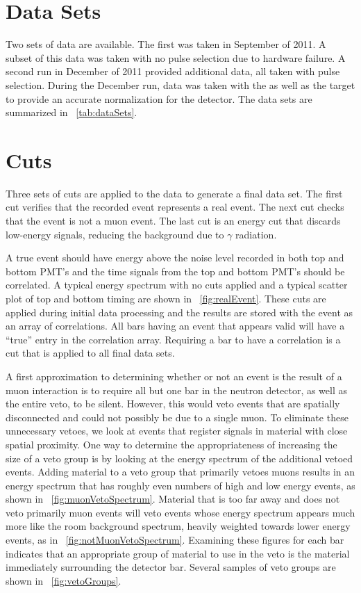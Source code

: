 \section{Data Sets}
Two sets of \reaction data are available.  The first was taken in September of 2011.  A subset of this data was taken with no pulse selection due to hardware failure.  A second run in December of 2011 provided additional data, all taken with pulse selection.  During the December run, data was taken with the \GeTargets as well as the  target to provide an accurate normalization for the detector.  The data sets are summarized in {\tab}~\ref{tab:dataSets}.

\section{Cuts}
Three sets of cuts are applied to the data to generate a final data set.  The first cut verifies that the recorded event represents a real event.  The next cut checks that the event is not a muon event.  The last cut is an energy cut that discards low-energy signals, reducing the background due to $\gamma$ radiation.

A true event should have energy above the noise level recorded in both top and bottom PMT's and the time signals from the top and bottom PMT's should be correlated.  A typical energy spectrum with no cuts applied and a typical scatter plot of top and bottom timing are shown in {\fig}~\ref{fig:realEvent}.  These cuts are applied during initial data processing and the results are stored with the event as an array of correlations.  All bars having an event that appears valid will have a ``true'' entry in the correlation array.  Requiring a bar to have a correlation is a cut that is applied to all final data sets.

A first approximation to determining whether or not an event is the result of a muon interaction is to require all but one bar in the neutron detector, as well as the entire veto, to be silent.  However, this would veto events that are spatially disconnected and could not possibly be due to a single muon.  To eliminate these unnecessary vetoes, we look at events that register signals in material with close spatial proximity.  One way to determine the appropriateness of increasing the size of a veto group is by looking at the energy spectrum of the additional vetoed events.  Adding material to a veto group that primarily vetoes muons results in an energy spectrum that has roughly even numbers of high and low energy events, as shown in {\fig}~\ref{fig:muonVetoSpectrum}.  Material that is too far away and does not veto primarily muon events will veto events whose energy spectrum appears much more like the room background spectrum, heavily weighted towards lower energy events, as in {\fig}~\ref{fig:notMuonVetoSpectrum}.  Examining these figures for each bar indicates that an appropriate group of material to use in the veto is the material immediately surrounding the detector bar.  Several samples of veto groups are shown in {\fig}~\ref{fig:vetoGroups}.

